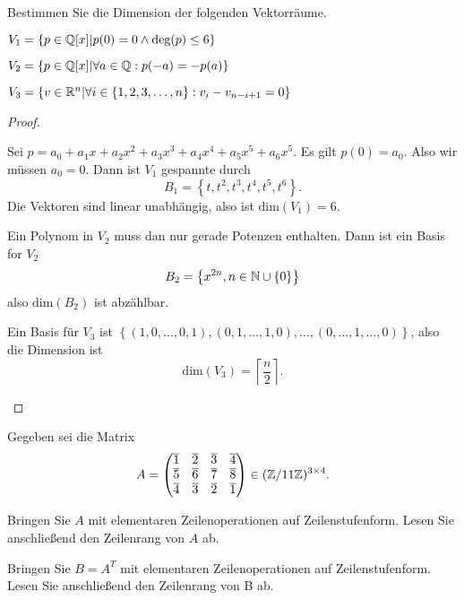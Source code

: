 \begin{Problem}
Bestimmen Sie die Dimension der folgenden Vektorräume.	
\begin{parts}
	\item $V_1=\left\{ p\in \mathbb{Q}[x]|p(0)=0\wedge \text{deg}(p)\le 6 \right\} $ 
	\item $V_2=\left\{ p\in \mathbb{Q}[x]|\forall a\in \mathbb{Q}:p(-a)=-p(a) \right\} $ 
	\item $V_3=\left\{ v\in \mathbb{R}^n|\forall i\in \left\{ 1,2,3,\dots, n \right\} :v_i-v_{n-i+1}=0 \right\} $
\end{parts}
\end{Problem}
\begin{proof}
	\begin{parts}
	\item Sei $p=a_0+a_1x+a_2x^2+a_3x^3+a_4x^4+a_5x^5+a_6x^5$. Es gilt $p(0)=a_0$. Also wir müssen $a_0=0$. Dann ist $V_1$ gespannte durch
		\[
		B_1=\left\{ t,t^2,t^3,t^4,t^5,t^6 \right\} 
	.\]
	Die Vektoren sind linear unabhängig, also ist $\text{dim}(V_1)=6$.
\item Ein Polynom in $V_2$ muss dan nur gerade Potenzen enthalten. Dann ist ein Basis for $V_2$ 
	\[
		B_2=\left\{ x^{2n}, n\in \mathbb{N}\cup \left\{ 0 \right\}  \right\} 
	\]
	also $\text{dim}(B_2)$ ist abzählbar.
\item Ein Basis f\"{u}r $V_3$ ist $\left\{ (1,0,\dots,0,1), (0,1,\dots,1,0), \dots, (0,\dots, 1,\dots,0) \right\} $, also die Dimension ist
	\[
		\text{dim}(V_3)=\left\lceil \frac{n}{2} \right\rceil 
	.\] 
	\end{parts}
\end{proof}
\begin{Problem}
	Gegeben sei die Matrix
	\[
		A=\begin{pmatrix} \overline{1} & \overline{2} & \overline{3} & \overline{4}\\ \overline{5} & \overline{6} & \overline{7} & \overline{8} \\ \overline{4}& \overline{3} & \overline{2} & \overline{1} \end{pmatrix} \in (\mathbb{Z} / 11\mathbb{Z})^{3\times 4}
	.\] 
	\begin{parts}
	\item Bringen Sie $A$ mit elementaren Zeilenoperationen auf Zeilenstufenform. Lesen Sie anschließend den Zeilenrang von $A$ ab.  
	\item Bringen Sie $B=A^T$ mit elementaren Zeilenoperationen auf Zeilenstufenform. Lesen Sie anschließend den Zeilenrang von B ab. 
	  \end{parts}
\end{Problem}
